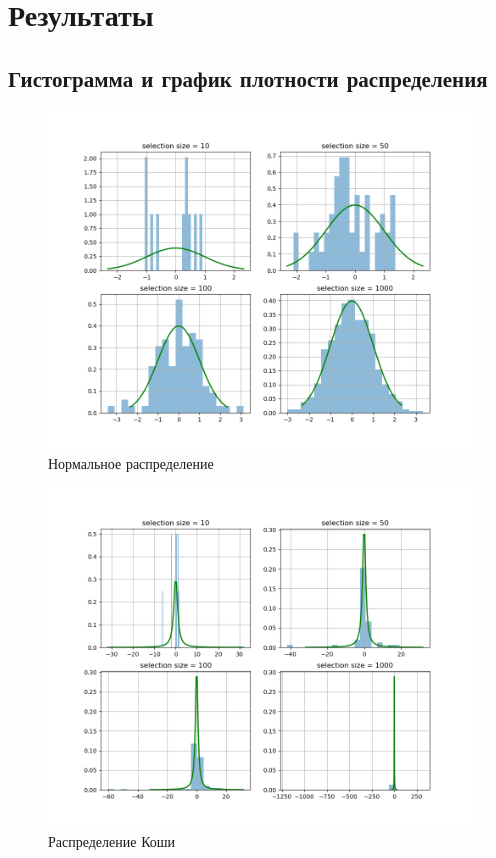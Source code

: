 \documentclass[a4]{article}
\begin{document}
	\section{Результаты}
		\subsection{Гистограмма и график плотности распределения}	
			\begin{center}
				
				\begin{figure}[h]
					\includegraphics[width=\textwidth]{normal.png} 
					\caption[Нормальное распределение]{Нормальное распределение}
				\end{figure}
				
				\begin{figure}
					\includegraphics[width=\textwidth]{cauchy.png}
					\caption[Распределение Коши]{Распределение Коши}
				\end{figure}
		

\end{center}
\end{document}
